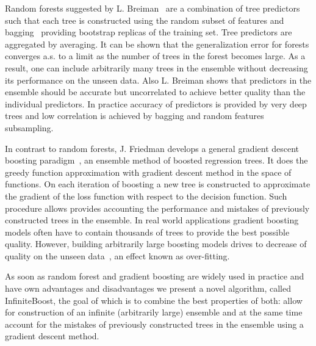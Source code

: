 Random forests suggested by L. Breiman~\cite{key-random-forest} are a combination of tree predictors such that each tree is constructed using the random subset of features and bagging~\cite{key-bagging} providing bootstrap replicas of the training set.
Tree predictors are aggregated by averaging.
It can be shown that the generalization error for forests converges a.s. to a limit as the number of trees in the forest becomes large. 
As a result, one can include arbitrarily many trees in the ensemble without decreasing its performance on the unseen data. %
Also L. Breiman shows that predictors in the ensemble should be accurate but uncorrelated to achieve better quality than the individual predictors. 
In practice accuracy of predictors is provided by very deep trees and low correlation is achieved by bagging and random features subsampling.

In contrast to random forests, J. Friedman develops a general gradient descent boosting paradigm~\cite{key-gb,key-sgb}, an ensemble method of boosted regression trees.
It does the greedy function approximation with gradient descent method in the space of functions. 
On each iteration of boosting a new tree is constructed to approximate the gradient of the loss function with respect to the decision function. 
Such procedure allows provides accounting the performance and mistakes of previously constructed trees in the ensemble.
In real world applications gradient boosting models often have to contain thousands of trees to provide the best possible quality.
However, building arbitrarily large boosting models drives to decrease of quality on the unseen data~\cite{key-brownboost, key-dart}, an effect known as over-fitting.

As soon as random forest and gradient boosting are widely used in practice and have own advantages and disadvantages we present a novel algorithm, called InfiniteBoost, the goal of which is to combine the best properties of both: allow for construction of an infinite (arbitrarily large) ensemble and at the same time account for the mistakes of previously constructed trees in the ensemble using a gradient descent method.


